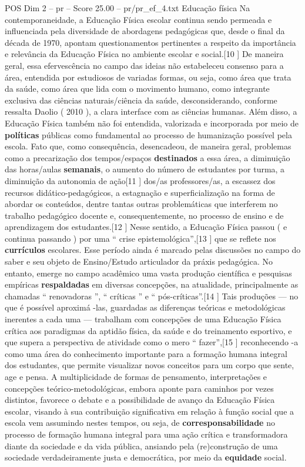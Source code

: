 \begin{textsample}{POS Dim 2 – pr – Score 25.00 – pr/pr\_ef\_4.txt}  \label{ex:f2_pos_118}
Educação física Na contemporaneidade, a Educação Física escolar continua sendo permeada e influenciada pela diversidade de abordagens pedagógicas que, desde o final da década de 1970, apontam questionamentos pertinentes a respeito da importância e relevância da Educação Física no ambiente escolar e social.[10 ] De maneira geral, essa efervescência no campo das ideias não estabeleceu consenso para a área, entendida por estudiosos de variadas formas, ou seja, como área que trata da saúde, como área que lida com o movimento humano, como integrante exclusiva das ciências naturais/ciência da saúde, desconsiderando, conforme ressalta Daolio ( 2010 ), a clara interface com as ciências humanas.
Além disso, a Educação Física também não foi entendida, valorizada e incorporada por meio de \textbf{políticas} públicas como fundamental ao processo de humanização possível pela escola.
Fato que, como consequência, desencadeou, de maneira geral, problemas como a precarização dos tempos/espaços \textbf{destinados} a essa área, a diminuição das horas/aulas \textbf{semanais}, o aumento do número de estudantes por turma, a diminuição da autonomia de ação[11 ] dos/as professores/as, a escassez dos recursos didático-pedagógicos, a estagnação e superficialização na forma de abordar os conteúdos, dentre tantas outras problemáticas que interferem no trabalho pedagógico docente e, consequentemente, no processo de ensino e de aprendizagem dos estudantes.[12 ] Nesse sentido, a Educação Física passou ( e continua passando ) por uma “ crise epistemológica”,[13 ] que se reflete nos \textbf{currículos} escolares.
Esse período ainda é marcado pelas discussões no campo do saber e seu objeto de Ensino/Estudo articulador da práxis pedagógica.
No entanto, emerge no campo acadêmico uma vasta produção científica e pesquisas empíricas \textbf{respaldadas} em diversas concepções, na atualidade, principalmente as chamadas “ renovadoras ”, “ críticas ” e “ pós-críticas”.[14 ] Tais produções — no que é possível aproximá -las, guardadas as diferenças teóricas e metodológicas inerentes a cada uma — trabalham com concepções de uma Educação Física crítica aos paradigmas da aptidão física, da saúde e do treinamento esportivo, e que supera a perspectiva de atividade como o mero “ fazer”,[15 ] reconhecendo -a como uma área do conhecimento importante para a formação humana integral dos estudantes, que permite visualizar novos conceitos para um corpo que sente, age e pensa.
A multiplicidade de formas de pensamento, interpretações e concepções teórico-metodológicas, embora aponte para caminhos por vezes distintos, favorece o debate e a possibilidade de avanço da Educação Física escolar, visando à sua contribuição significativa em relação à função social que a escola vem assumindo nestes tempos, ou seja, de \textbf{corresponsabilidade} no processo de formação humana integral para uma ação crítica e transformadora diante da sociedade e da vida pública, ansiando pela (re)construção de uma sociedade verdadeiramente justa e democrática, por meio da \textbf{equidade} social.

\end{textsample}
